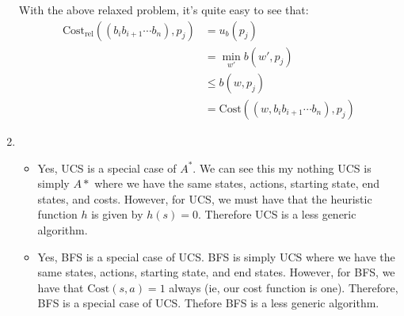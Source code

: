 \documentclass[12pt]{article}
\begin{document}
\begin{enumerate}[label=(\alph*)]
  With the above relaxed problem, it's quite easy to see that:
  \begin{align*}
    \text{Cost}_{\text{rel}}((b_ib_{i+1}\cdots b_n), p_j) &= u_b(p_j) \tag{definition of Cost} \\
    &= \min_{w'} b(w', p_j) \tag{definition of $u_b$}\\
    &\leq b(w, p_j) \tag{where $w$ is the previous word picked, as in original problem} \\
    &= \text{Cost}((w, b_ib_{i+1}\cdots b_n), p_j)
  \end{align*}
  \item 
  \begin{itemize}
    \item Yes, UCS is a special case of $A^*$. We can see this my nothing UCS is simply $A*$ where we have the same states, actions, starting state, end states, and costs. However, for UCS, we must have that the heuristic function $h$ is given by $h(s) = 0$. Therefore UCS is a less generic algorithm.
    \item Yes, BFS is a special case of UCS. BFS is simply UCS where we have the same states, actions, starting state, and end states. However, for BFS, we have that $\text{Cost}(s,a) = 1$ always (ie, our cost function is one). Therefore, BFS is a special case of UCS. Thefore BFS is a less generic algorithm.
  \end{itemize}
\end{enumerate}
\end{document}

